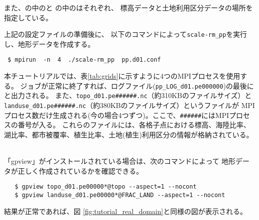 また、の中のと
の中のはそれぞれ、
標高データと土地利用区分データの場所を指定している。


上記の設定ファイルの準備後に、
以下のコマンドによって\verb|scale-rm_pp|を実行し、地形データを作成する。
\begin{verbatim}
 $ mpirun  -n  4  ./scale-rm_pp  pp.d01.conf
\end{verbatim}
本チュートリアルでは、表\ref{tab:grids}に示すように4つのMPIプロセスを使用する。
ジョブが正常に終了すれば、ログファイル(\verb|pp_LOG_d01.pe000000|)の最後に
と出力される。
また、\verb|topo_d01.pe######.nc|（約310KBのファイルサイズ）と\\
\verb|landuse_d01.pe######.nc|（約380KBのファイルサイズ）というファイルが
MPIプロセス数だけ生成される(今の場合4つずつ)。ここで、\verb|######|にはMPIプロセスの番号が入る。
これらのファイルには、各格子点における標高、海陸比率、湖比率、都市被覆率、植生比率、土地(植生)利用区分の情報が格納されている。


 \vspace{1cm}
  \hrulefill \\
 「gpview」がインストールされている場合は、次のコマンドによって
 地形データが正しく作成されているかを確認できる。
 \begin{verbatim}
   $ gpview topo_d01.pe00000*@topo --aspect=1 --nocont
   $ gpview landuse_d01.pe00000*@FRAC_LAND --aspect=1 --nocont
 \end{verbatim}
 結果が正常であれば、図 \ref{fig:tutorial_real_domain}と同様の図が表示される。
